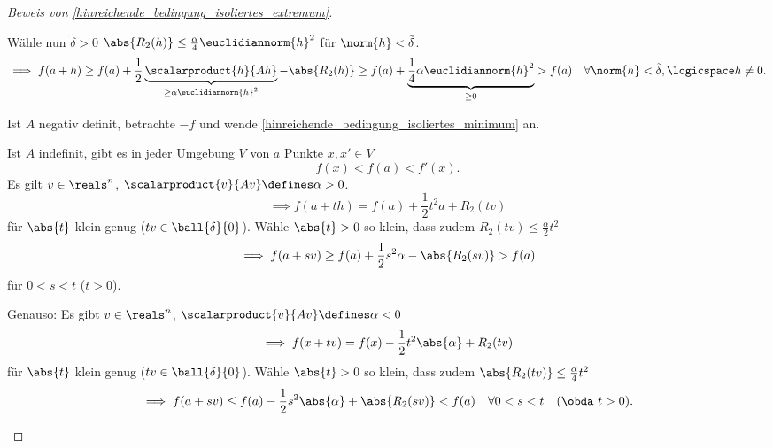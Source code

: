 \begin{proof}[Beweis von \ref{hinreichende_bedingung_isoliertes_extremum}]
\begin{proofdescription}
    Wähle nun \( \tilde{\delta}>0 \) \sd \( \abs{R_2(h)}\leq \frac{\alpha}{4}\euclidiannorm{h}^2 \) für \( \norm{h}<\tilde{\delta} \).
    \begin{equation*}
      \implies f(a+h)\geq f(a)+\frac{1}{2}\underbrace{\scalarproduct{h}{Ah}}_{\geq \alpha\euclidiannorm{h}^2}-\abs{R_2(h)}\geq f(a)+\underbrace{\frac{1}{4}\alpha\euclidiannorm{h}^2}_{\geq 0}>f(a)\quad \forall \norm{h}<\tilde{\delta},\logicspace  h\neq 0.
    \end{equation*}
    \item[\ref{hinreichende_bedingung_isoliertes_maximum}] Ist \( A \) negativ definit, betrachte \( -f \) und wende \ref{hinreichende_bedingung_isoliertes_minimum} an.
    \item[\ref{hinreichende_bedingung_kein_extremum}] Ist \( A \) indefinit, gibt es in jeder Umgebung \( V \) von \( a \) Punkte \( x,x'\in V \) \sd 
    \begin{equation*}
      f(x)<f(a)<f'(x).
    \end{equation*}
    Es gilt \( v\in \reals^n \), \sd \( \scalarproduct{v}{Av}\defines \alpha >0 \).
    \begin{equation*}
      \implies f(a+th)= f(a)+\frac{1}{2}t^2 a+R_2(tv)
    \end{equation*}
    für \( \abs{t} \) klein genug (\sd \( tv\in \ball{\delta}{0} \)). Wähle \( \abs{t}>0 \) so klein, dass zudem \( R_2(tv)\leq \frac{\alpha}{2}t^2 \)
    \begin{equation*}
      \implies f(a+sv)\geq f(a)+\frac{1}{2}s^2\alpha-\abs{R_2(sv)}>f(a)
    \end{equation*}
    für \( 0<s<t \) (\obda \( t>0 \)). 
    
    Genauso: Es gibt \( v\in \reals^n \), \sd \( \scalarproduct{v}{Av}\defines \alpha<0 \)
    \begin{equation*}
      \implies f(x+tv)=f(x)-\frac{1}{2}t^2\abs{\alpha}+R_2(tv)
    \end{equation*}
    für \( \abs{t} \) klein genug (\sd \( tv\in \ball{\delta}{0} \)). Wähle \( \abs{t}>0 \) so klein, dass zudem \( \abs{R_2(tv)}\leq\frac{\alpha}{4}t^2 \)
    \begin{equation*}
      \implies f(a+sv)\leq f(a)-\frac{1}{2}s^2\abs{\alpha}+\abs{R_2(sv)}<f(a)\quad \forall 0<s<t\quad (\text{\obda }t>0).
    \end{equation*}
  \end{proofdescription}
\end{proof}
